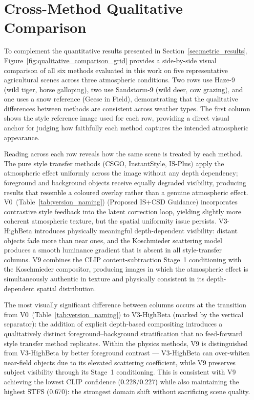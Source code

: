 \FloatBarrier
\section{Cross-Method Qualitative Comparison}
\label{sec:cross_method_qualitative}

\noindent To complement the quantitative results presented in Section~\ref{sec:metric_results}, Figure~\ref{fig:qualitative_comparison_grid} provides a side-by-side visual comparison of all six methods evaluated in this work on five representative agricultural scenes across three atmospheric conditions. Two rows use Haze-9 (wild tiger, horse galloping), two use Sandstorm-9 (wild deer, cow grazing), and one uses a snow reference (Geese in Field), demonstrating that the qualitative differences between methods are consistent across weather types. The first column shows the style reference image used for each row, providing a direct visual anchor for judging how faithfully each method captures the intended atmospheric appearance.

\noindent Reading across each row reveals how the same scene is treated by each method. The pure style transfer methods (CSGO, InstantStyle, IS-Plus) apply the atmospheric effect uniformly across the image without any depth dependency; foreground and background objects receive equally degraded visibility, producing results that resemble a coloured overlay rather than a genuine atmospheric effect. V0~(Table~\ref{tab:version_naming}) (Proposed IS+CSD Guidance) incorporates contrastive style feedback into the latent correction loop, yielding slightly more coherent atmospheric texture, but the spatial uniformity issue persists. V3-HighBeta introduces physically meaningful depth-dependent visibility: distant objects fade more than near ones, and the Koschmieder scattering model produces a smooth luminance gradient that is absent in all style-transfer columns. V9 combines the CLIP content-subtraction Stage~1 conditioning with the Koschmieder compositor, producing images in which the atmospheric effect is simultaneously authentic in texture and physically consistent in its depth-dependent spatial distribution.

\noindent The most visually significant difference between columns occurs at the transition from V0~(Table~\ref{tab:version_naming}) to V3-HighBeta (marked by the vertical separator): the addition of explicit depth-based compositing introduces a qualitatively distinct foreground--background stratification that no feed-forward style transfer method replicates. Within the physics methods, V9 is distinguished from V3-HighBeta by better foreground contrast --- V3-HighBeta can over-whiten near-field objects due to its elevated scattering coefficient, while V9 preserves subject visibility through its Stage~1 conditioning. This is consistent with V9 achieving the lowest CLIP confidence (0.228/0.227) while also maintaining the highest STFS (0.670): the strongest domain shift without sacrificing scene quality.

